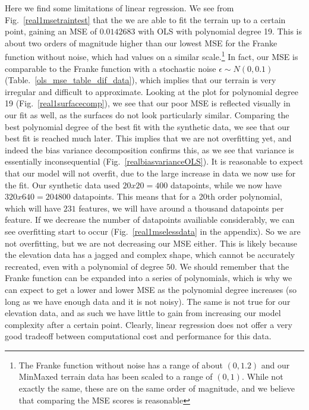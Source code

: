 \documentclass[twocolumn,10pt,cleanfoot]{asme2ej}
\begin{document}
Here we find some limitations of linear regression. We see from Fig.~\ref{real1msetraintest} that the we are able to fit the terrain up to a certain point, gaining an MSE of $0.0142683$ with OLS with polynomial degree 19. This is about two orders of magnitude higher than our lowest MSE for the Franke function without noise, which had values on a similar scale.\footnote{The Franke function without noise has a range of about $(0,1.2)$ and our MinMaxed terrain data has been scaled to a range of $(0,1)$. While not exactly the same, these are on the same order of magnitude, and we believe that comparing the MSE scores is reasonable} In fact, our MSE is comparable to the Franke function with a stochastic noise $\epsilon \sim N(0,0.1)$ (Table.~\ref{ols_mse_table_dif_data}), which implies that our terrain is very irregular and difficult to approximate. Looking at the plot for polynomial degree 19 (Fig.~\ref{real1surfacecomp}), we see that our poor MSE is reflected visually in our fit as well, as the surfaces do not look particularly similar. Comparing the best polynomial degree of the best fit with the synthetic data, we see that our best fit is reached much later. This implies that we are not overfitting yet, and indeed the bias variance decomposition confirms this, as we see that variance is essentially inconsequential (Fig.~\ref{realbiasvarianceOLS}). %
It is reasonable to expect that our model will not overfit, due to the large increase in data we now use for the fit. Our synthetic data used $20 x 20 = 400$ datapoints, while we now have $320 x 640 = 204 800$ datapoints. This means that for a 20th order polynomial, which will have $231$ features, we will have around a thousand datapoints per feature. If we decrease the number of datapoints availiable considerably, we can see overfitting start to occur (Fig.~\ref{real1mselessdata} in the appendix). So we are not overfitting, but we are not decreasing our MSE either. This is likely because the elevation data has a jagged and complex shape, which cannot be accurately recreated, even with a polynomial of degree $50$. We should remember that the Franke function can be expanded into a series of polynomials, which is why we can expect to get a lower and lower MSE as the polynomial degree increases (so long as we have enough data and it is not noisy). The same is not true for our elevation data, and as such we have little to gain from increasing our model complexity after a certain point. Clearly, linear regression does not offer a very good tradeoff between computational cost and performance for this data.
\end{document}
